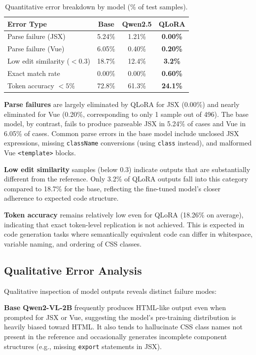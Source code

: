\begin{table}[h]
\centering
\caption{Quantitative error breakdown by model (\% of test samples).}
\label{tab:error_quant}
\begin{tabular}{lccc}
\hline
\textbf{Error Type} & \textbf{Base} & \textbf{Qwen2.5} & \textbf{QLoRA} \\
\hline
Parse failure (JSX) & 5.24\% & 1.21\% & \textbf{0.00\%} \\
Parse failure (Vue) & 6.05\% & 0.40\% & \textbf{0.20\%} \\
Low edit similarity ($<0.3$) & 18.7\% & 12.4\% & \textbf{3.2\%} \\
Exact match rate & 0.00\% & 0.00\% & \textbf{0.60\%} \\
Token accuracy $<5\%$ & 72.8\% & 61.3\% & \textbf{24.1\%} \\
\hline
\end{tabular}
\end{table}

\textbf{Parse failures} are largely eliminated by QLoRA for JSX (0.00\%) and nearly eliminated for Vue (0.20\%, corresponding to only 1 sample out of 496). The base model, by contrast, fails to produce parseable JSX in 5.24\% of cases and Vue in 6.05\% of cases. Common parse errors in the base model include unclosed JSX expressions, missing \texttt{className} conversions (using \texttt{class} instead), and malformed Vue \texttt{<template>} blocks.

\textbf{Low edit similarity} samples (below 0.3) indicate outputs that are substantially different from the reference. Only 3.2\% of QLoRA outputs fall into this category compared to 18.7\% for the base, reflecting the fine-tuned model's closer adherence to expected code structure.

\textbf{Token accuracy} remains relatively low even for QLoRA (18.26\% on average), indicating that exact token-level replication is not achieved. This is expected in code generation tasks where semantically equivalent code can differ in whitespace, variable naming, and ordering of CSS classes.

\subsection{Qualitative Error Analysis}

Qualitative inspection of model outputs reveals distinct failure modes:

\textbf{Base Qwen2-VL-2B} frequently produces HTML-like output even when prompted for JSX or Vue, suggesting the model's pre-training distribution is heavily biased toward HTML. It also tends to hallucinate CSS class names not present in the reference and occasionally generates incomplete component structures (e.g., missing \texttt{export} statements in JSX).

